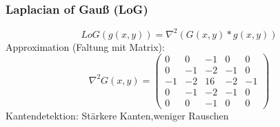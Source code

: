 \subsubsection{Laplacian of Gauß (LoG)}

$$LoG(g(x,y)) = \nabla^2 (G(x,y) * g(x,y))$$ Approximation (Faltung mit Matrix): $$\nabla^2 G(x,y) = \left( \begin{array}{rrrrr} 0 & 0 & -1 & 0 & 0 \\ 0 & -1 & -2 & -1 & 0 \\ -1 & -2 & 16 & -2 & -1 \\ 0 & -1 & -2 & -1 & 0 \\ 0 & 0 & -1 & 0 & 0 \end{array} \right)$$
Kantendetektion: Stärkere Kanten,weniger Rauschen

